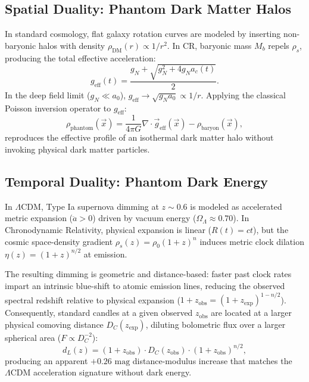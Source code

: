 \documentclass[aps,prd,reprint,superscriptaddress,nofootinbib,floatfix,amsmath,amssymb]{revtex4-2}
\begin{document}
\subsection{Spatial Duality: Phantom Dark Matter Halos}

In standard cosmology, flat galaxy rotation curves are modeled by inserting non-baryonic halos with density $\rho_{\text{DM}}(r) \propto 1/r^2$. In CR, baryonic mass $M_b$ repels $\rho_s$, producing the total effective acceleration:
\begin{equation}
g_{\text{eff}}(t) = \frac{g_N + \sqrt{g_N^2 + 4 g_N a_c(t)}}{2}.
\label{eq:geff}
\end{equation}
In the deep field limit ($g_N \ll a_0$), $g_{\text{eff}} \to \sqrt{g_N a_0} \propto 1/r$. Applying the classical Poisson inversion operator to $g_{\text{eff}}$:
\begin{equation}
\rho_{\text{phantom}}(\vec{x}) = \frac{1}{4\pi G} \nabla \cdot \vec{g}_{\text{eff}}(\vec{x}) - \rho_{\text{baryon}}(\vec{x}),
\label{eq:poisson_inversion}
\end{equation}
reproduces the effective profile of an isothermal dark matter halo without invoking physical dark matter particles.

\subsection{Temporal Duality: Phantom Dark Energy}

In $\Lambda\text{CDM}$, Type Ia supernova dimming at $z \sim 0.6$ is modeled as accelerated metric expansion ($\ddot{a} > 0$) driven by vacuum energy ($\Omega_\Lambda \approx 0.70$). In Chronodynamic Relativity, physical expansion is linear ($R(t) = c t$), but the cosmic space-density gradient $\rho_s(z) = \rho_0 (1+z)^n$ induces metric clock dilation $\eta(z) = (1+z)^{n/2}$ at emission. 

The resulting dimming is geometric and distance-based: faster past clock rates impart an intrinsic blue-shift to atomic emission lines, reducing the observed spectral redshift relative to physical expansion ($1+z_{\text{obs}} = (1+z_{\text{exp}})^{1 - n/2}$). Consequently, standard candles at a given observed $z_{\text{obs}}$ are located at a larger physical comoving distance $D_C(z_{\text{exp}})$, diluting bolometric flux over a larger spherical area ($F \propto D_C^{-2}$):
\begin{equation}
d_L(z) = (1+z_{\text{obs}}) \cdot D_C(z_{\text{obs}}) \cdot (1+z_{\text{obs}})^{n/2},
\label{eq:dl_cr}
\end{equation}
producing an apparent $+0.26\text{ mag}$ distance-modulus increase that matches the $\Lambda\text{CDM}$ acceleration signature without dark energy.
\end{document}
